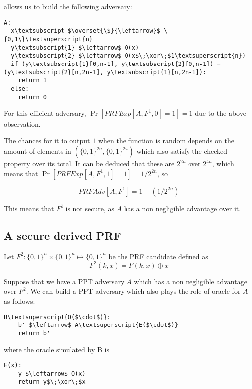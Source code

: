 \documentclass{article}
\newcommand{\bit}[1]{\{0,1\}^{#1}}
\newcommand{\xor}{\oplus}
\begin{document}
allows us to build the following adversary:

\begin{Verbatim}[commandchars=\\\{\},codes={\catcode`$=3\catcode`_=8}]
A:
  x\textsubscript $\overset{\$}{\leftarrow}$ \{0,1\}\textsuperscript{n}
  y\textsubscript{1} $\leftarrow$ O(x)
  y\textsubscript{2} $\leftarrow$ O(x$\;\xor\;$1\textsuperscript{n})
  if (y\textsubscript{1}[0,n-1], y\textsubscript{2}[0,n-1]) = (y\textsubscript{2}[n,2n-1], y\textsubscript{1}[n,2n-1]):
    return 1
  else:
    return 0
\end{Verbatim}

For this efficient adversary, $\Pr[PRFExp[A,F^1,0]=1]=1$ due to the above observation.

The chances for it to output $1$ when the function is random depends on the amount
of elements in $(\bit{2n}, \bit{2n})$ which also satisfy the checked property over 
its total.
It can be deduced that these are $2^{2n}$ over $2^{4n}$, which means that 
$\Pr[PRFExp[A,F^1,1]=1]=1/2^{2n}$, so 

$$
PRFAdv[A,F^1] = 1 - (1/2^{2n})
$$

This means that $F^1$ is not secure, as $A$ has a non negligible advantage over it. 

\subsection{A secure derived PRF }

Let $F^2: \bit{n} \times \bit{n} \mapsto\bit{n}$ be the PRF candidate
defined as 
$$F^2(k, x) = F(k, x) \xor x$$

Suppose that we have a PPT adversary $A$ which has a non negligible advantage over 
$F^2$. We can build a PPT adversary which also plays the role of oracle for 
$A$ as follows:

\begin{Verbatim}[commandchars=\\\{\},codes={\catcode`$=3\catcode`_=8}]
  B\textsuperscript{O($\cdot$)}:
    b' $\leftarrow$ A\textsuperscript{E($\cdot$)}
    return b'
\end{Verbatim}

where the oracle simulated by B is

\begin{Verbatim}[commandchars=\\\{\},codes={\catcode`$=3\catcode`_=8}]
  E(x):
    y $\leftarrow$ O(x)
    return y$\;\xor\;$x
\end{Verbatim}
\end{document}
